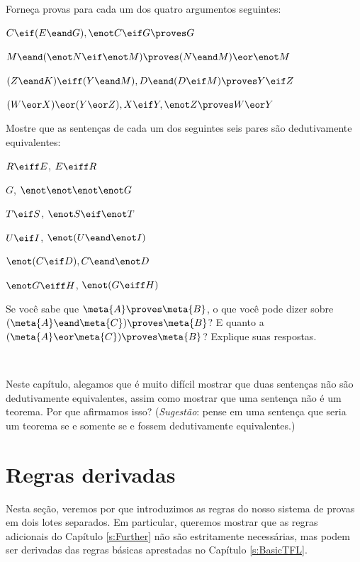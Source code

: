 \problempart
Forneça provas para cada um dos quatro argumentos seguintes:
\begin{earg}
\item $C\eif(E\eand G), \enot C \eif G \proves G$
\item $M \eand (\enot N \eif \enot M) \proves (N \eand M) \eor \enot M$
\item $(Z\eand K)\eiff(Y\eand M), D\eand(D\eif M) \proves Y\eif Z$
\item $(W \eor X) \eor (Y \eor Z), X\eif Y, \enot Z \proves W\eor Y$
\end{earg}

\problempart
Mostre que as sentenças de cada um dos seguintes seis pares são dedutivamente equivalentes:
\begin{earg}
\item $R \eiff E$, $E \eiff R$
\item $G$, $\enot\enot\enot\enot G$
\item $T\eif S$, $\enot S \eif \enot T$
\item $U \eif I$, $\enot(U \eand \enot I)$
\item $\enot (C \eif D), C \eand \enot D$
\item $\enot G \eiff H$, $\enot(G \eiff H)$ 
\end{earg}

\problempart
 Se você sabe que $\meta{A}\proves\meta{B}$, o que você pode dizer sobre $(\meta{A}\eand\meta{C})\proves\meta{B}$? E quanto a $(\meta{A}\eor\meta{C})\proves\meta{B}$? Explique suas respostas.

\

\problempart Neste capítulo, alegamos que é muito difícil mostrar que duas sentenças não são dedutivamente equivalentes, assim como mostrar que uma sentença não é um teorema. Por que afirmamos isso? (\emph{Sugestão}: pense em uma sentença que seria um teorema se e somente se  e  fossem dedutivamente equivalentes.)


\chapter{Regras derivadas}\label{s:Derived}
Nesta seção, veremos por que introduzimos as regras do nosso sistema de provas em dois lotes separados. Em particular, queremos mostrar que as regras adicionais do Capítulo \ref{s:Further} não são estritamente necessárias, mas podem ser derivadas das regras básicas aprestadas no Capítulo \ref{s:BasicTFL}. 

